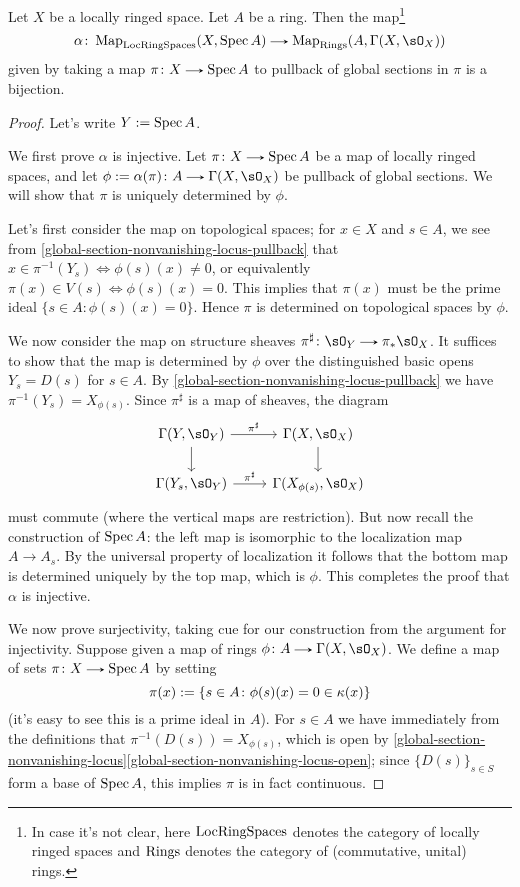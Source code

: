 \begin{proposition}
  \label{affine-adjunction}
  Let $X$ be a locally ringed space. Let $A$ be a ring. Then the map\footnote{In case it's not clear, here $\mathrm{LocRingSpaces}$ denotes the category of locally ringed spaces and $\mathrm{Rings}$ denotes the category of (commutative, unital) rings.}
  \[
    \alpha \c \Map_\LocRingSpaces(X,\Spec A) \to \Map_\Rings(A, \Gamma(X,\sO_X))
  \]
  given by taking a map $\pi \c X \to \Spec A$ to pullback of global sections in $\pi$ is a bijection.

  \begin{proof}
    Let's write $Y \mathrel{:=} \operatorname{Spec} A$.
    
    We first prove $\alpha$ is injective. Let $\pi \c X \to \Spec A$ be a map of locally ringed spaces, and let $\phi \ce \alpha(\pi) \c A \to \Gamma(X,\sO_X)$ be pullback of global sections. We will show that $\pi$ is uniquely determined by $\phi$.
    
    Let's first consider the map on topological spaces; for $x \in X$ and $s \in A$, we see from \cref{global-section-nonvanishing-locus-pullback} that $x \in \pi^{-1}(Y_s) \iff \phi(s)(x) \ne 0$, or equivalently $\pi(x) \in V(s) \iff \phi(s)(x) = 0$. This implies that $\pi(x)$ must be the prime ideal $\{s \in A : \phi(s)(x) = 0\}$. Hence $\pi$ is determined on topological spaces by $\phi$.

    We now consider the map on structure sheaves $\pi^\sharp \c \sO_Y \to \pi_*\sO_X$. It suffices to show that the map is determined by $\phi$ over the distinguished basic opens $Y_s = D(s)$ for $s \in A$. By \cref{global-section-nonvanishing-locus-pullback} we have $\pi^{-1}(Y_s) = X_{\phi(s)}$. Since $\pi^\sharp$ is a map of sheaves, the diagram
    \[
      \begin{tikzcd}
        \Gamma(Y,\sO_Y) \ar[r, "\pi^\sharp"] \ar[d] &
        \Gamma(X,\sO_X) \ar[d] \\
        \Gamma(Y_s,\sO_Y) \ar[r, "\pi^\sharp"] &
        \Gamma(X_{\phi(s)},\sO_X)
      \end{tikzcd}
    \]
    must commute (where the vertical maps are restriction). But now recall the construction of $\operatorname{Spec} A$: the left map is isomorphic to the localization map $A \to A_s$. By the universal property of localization it follows that the bottom map is determined uniquely by the top map, which is $\phi$. This completes the proof that $\alpha$ is injective.

    We now prove surjectivity, taking cue for our construction from the argument for injectivity. Suppose given a map of rings $\phi \c A \to \Gamma(X,\sO_X)$. We define a map of sets $\pi \c X \to \Spec A$ by setting
    \[
      \pi(x) \mathrel{:=} \{s \in A \colon \phi(s)(x) = 0 \in \kappa(x)\}
    \]
    (it's easy to see this is a prime ideal in $A$). For $s \in A$ we have immediately from the definitions that $\pi^{-1}(D(s)) = X_{\phi(s)}$, which is open by \cref{global-section-nonvanishing-locus}\cref{global-section-nonvanishing-locus-open}; since $\{D(s)\}_{s \in S}$ form a base of $\operatorname{Spec} A$, this implies $\pi$ is in fact continuous.


\end{proof}
\end{proposition}
